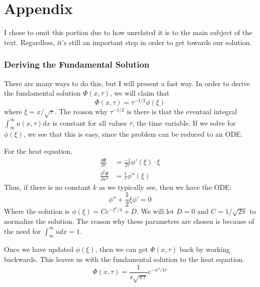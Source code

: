 \documentclass{article}
\begin{document}
\printbibliography

\section*{Appendix}
I chose to omit this portion due to how unrelated it is to the main subject of the text. Regardless, it's still an important step in order to get towards our solution.

\subsubsection*{Deriving the Fundamental Solution}
There are many ways to do this, but I will present a fast way. In order to derive the fundamental solution $\Phi(x, \tau)$, we will claim that 
\begin{equation*}
    \Phi(x, \tau) = \tau^{-1/2} \phi(\xi)
\end{equation*}
where $\xi = x / \sqrt{\tau}$. The reason why $\tau^{-1/2}$ is there is that the eventual integral $\int_{\infty}^{\infty} u(x,\tau) dx$ is constant for all values $\tau$, the time variable. If we solve for $\phi(\xi)$, we see that this is easy, since the problem can be reduced to an ODE.

For the heat equation,
\begin{align*}
    \frac{\partial \Phi}{\partial \tau} &= \frac{-1}{2\tau}\phi'(\xi) \cdot \xi \\
    \frac{\partial^2 \Phi}{\partial x^2} &= \frac{1}{\tau}\phi''(\xi)
\end{align*}
Thus, if there is no constant $k$ as we typically see, then we have the ODE:
\begin{equation*}
    \phi'' + \frac{1}{2}\xi \phi' = 0
\end{equation*}
Where the solution is $\phi(\xi) = Ce^{-\xi^2 / 4} + D$. We will let $D = 0$ and $C = 1/\sqrt{2\pi}$ to normalize the solution. The reason why these parameters are chosen is because of the need for $\int_{\infty}^{\infty} u dx = 1$. 

Once we have updated $\phi(\xi)$, then we can get $\Phi(x, \tau)$ back by working backwards. This leaves us with the fundamental solution to the heat equation.
\begin{equation*}
    \Phi(x, \tau) = \frac{1}{s\sqrt{\pi \tau}}e^{-x^2 / 4\tau}
\end{equation*}
\end{document}
